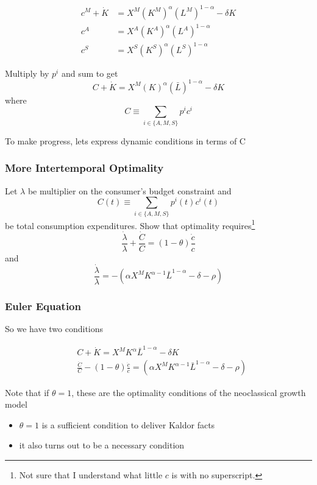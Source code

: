 \documentclass[10pt]{article}
\begin{document}
\begin{align}
    c^M+\dot{K} & =X^M\left(K^M\right)^\alpha\left(L^M\right)^{1-\alpha}-\delta K \\
    c^A & =X^A\left(K^A\right)^\alpha\left(L^A\right)^{1-\alpha} \\
    c^S & =X^S\left(K^S\right)^\alpha\left(L^S\right)^{1-\alpha}
\end{align}

Multiply by $p^i$ and sum to get
$$
C+\dot{K}=X^M(K)^\alpha(\bar{L})^{1-\alpha}-\delta K
$$
where
$$
C \equiv \sum_{i \in\{A, M, S\}} p^i c^i
$$

To make progress, lets express dynamic conditions in terms of C


\subsubsection{More Intertemporal Optimality}

Let $\lambda$ be multiplier on the consumer's budget constraint and
$$
C(t) \equiv \sum_{i \in\{A, M, S\}} p^i(t) c^i(t)
$$
be total consumption expenditures. Show that optimality requires\footnote{
    \color{red}
    Not sure that I understand what little $c$ is with no superscript. 
    \color{black}
}
$$
\frac{\dot{\lambda}}{\lambda}+\frac{\dot{C}}{C}=(1-\theta) \frac{\dot{c}}{c}
$$
and
$$
\frac{\dot{\lambda}}{\lambda}=-\left(\alpha X^M K^{\alpha-1} \bar{L}^{1-\alpha}-\delta-\rho\right)
$$


\subsubsection{Euler Equation}

So we have two conditions

\begin{align}
    &C+\dot{K}=X^M K^\alpha \bar{L}^{1-\alpha}-\delta K \\
    &\frac{\dot{C}}{C}-(1-\theta) \frac{\dot{c}}{c}=\left(\alpha X^M K^{\alpha-1} \bar{L}^{1-\alpha}-\delta-\rho\right)
\end{align}

Note that if $\theta=1$, these are the optimality conditions of the neoclassical growth model

\begin{itemize}
    \item $\theta=1$ is a sufficient condition to deliver Kaldor facts
    \item it also turns out to be a necessary condition
\end{itemize}
\end{document}
